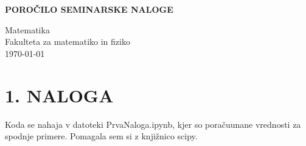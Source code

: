 \documentclass{article}
\begin{document}
\begin{titlepage}
\begin{center}
       \vspace*{1cm}

       \textbf{POROČILO SEMINARSKE NALOGE}

       \vspace{0.5cm}

            
       \vspace{1.5cm}


       \vfill
            
     
            
       Matematika\\
       Fakulteta za matematiko in fiziko\\
       \today
            
   \end{center}
\end{titlepage}

\section*{1. NALOGA}
Koda se nahaja v datoteki PrvaNaloga.ipynb, kjer so poračuunane vrednosti za spodnje primere. Pomagala sem si z knjižnico scipy.
\end{document}
